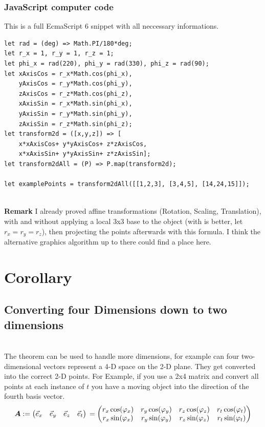 \documentclass[a4paper]{article}
\begin{document}
\subsubsection{JavaScript computer code}
\begin{example}
This is a full EcmaScript 6 snippet with all neccessary informations.\\
\begin{lstlisting}
let rad = (deg) => Math.PI/180*deg;
let r_x = 1, r_y = 1, r_z = 1; 
let phi_x = rad(220), phi_y = rad(330), phi_z = rad(90); 
let xAxisCos = r_x*Math.cos(phi_x), 
    yAxisCos = r_y*Math.cos(phi_y),
    zAxisCos = r_z*Math.cos(phi_z),
    xAxisSin = r_x*Math.sin(phi_x), 
    yAxisSin = r_y*Math.sin(phi_y),
    zAxisSin = r_z*Math.sin(phi_z);
let transform2d = ([x,y,z]) => [
    x*xAxisCos+ y*yAxisCos+ z*zAxisCos,
    x*xAxisSin+ y*yAxisSin+ z*zAxisSin];
let transform2dAll = (P) => P.map(transform2d);

let examplePoints = transform2dAll([[1,2,3], [3,4,5], [14,24,15]]);
\end{lstlisting}
\end{example}\\

\textbf{Remark} I already proved affine transformations (Rotation, Scaling, Translation),
with and without applying a local 3x3 base to the object (with is better, let $r_x = r_y = r_z$), then projecting the points afterwards with 
this formula. I think the alternative graphics algorithm up to there could find a place here.\\

\section{Corollary}

\subsection{Converting four Dimensions down to two dimensions}\\

The theorem can be used to handle more dimensions, for example can four two-dimensional
vectors represent a 4-D space on the 2-D plane. They get converted into the correct
2-D points. For Example, if you use a 2x4 matrix and convert all points at each 
instance of $t$ you have a moving object into the direction of the fourth basis vector. \\

\begin{displaymath}
\boldsymbol{A} := \begin{pmatrix}
    \vec{e}_x & \vec{e}_y & \vec{e}_z & \vec{e}_t\end{pmatrix}\\ = 
    \begin{pmatrix}
    r_x\cos(\varphi_x) & r_y\cos(\varphi_y) & r_z\cos(\varphi_z) & r_t\cos(\varphi_t)\\
    r_x\sin(\varphi_x) & r_y\sin(\varphi_y) & r_z\sin(\varphi_z) & r_t\sin(\varphi_t)\\
    \end{pmatrix}
\end{displaymath}
\end{document}
